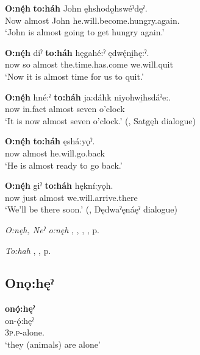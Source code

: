 \ea
\label{ex:opart42}
\gll \textbf{O:nę́h} \textbf{to:háh} John ęhshodǫ̱hswéˀdęˀ.\\
Now almost John he.will.become.hungry.again.\\
\glt ‘John is almost going to get hungry again.’
\z

\ea
\label{ex:opart43}
\gll \textbf{O:nę́h} diˀ \textbf{to:háh} hęgahé:ˀ ędwę́ni̱hę:ˀ.\\
now so almost the.time.has.come we.will.quit\\
\glt ‘Now it is almost time for us to quit.’
\z

\ea
\label{ex:opart44}
\gll \textbf{O:nę́h} hné:ˀ \textbf{to:háh} ja:dáhk niyohwi̱hsdáˀe:.\\
now in.fact almost seven o’clock\\
\glt ‘It is now almost seven o’clock.’ (\cite[142]{mithun_watewayestanih_1984}, Satgęh dialogue)
\z

\ea
\label{ex:opart45}
\gll \textbf{O:nę́h} \textbf{to:háh} ęshá:yǫˀ.\\
now almost he.will.go.back\\
\glt ‘He is almost ready to go back.’
\z

\ea
\label{ex:opart46}
\gll \textbf{O:nę́h} giˀ \textbf{to:háh} hękní:yǫh.\\
now just almost we.will.arrive.there\\
\glt ‘We’ll be there soon.’ (\cite[481]{mithun_watewayestanih_1984}, Dędwaˀęnáęˀ dialogue)
\z

\begin{CayugaRelated}
\item \textit{O:nęh, Neˀ o:nęh} , , , , p. \pageref{p:[o:nęh]}\\
\item \textit{To:hah} , , p. \pageref{p:[to:hah]}
\end{CayugaRelated}


\subsection*{\textbf{Onǫ:hęˀ} } \label{p:[onǫ:hęˀ]}

\ea
\label{ex:opart47} \textbf{onǫ́:hęˀ}\\
\gll on-ǫ́:hęˀ\\
\textsc{3p.p}-alone.{\stative}\\
\glt ‘they (animals) are alone’
\z


